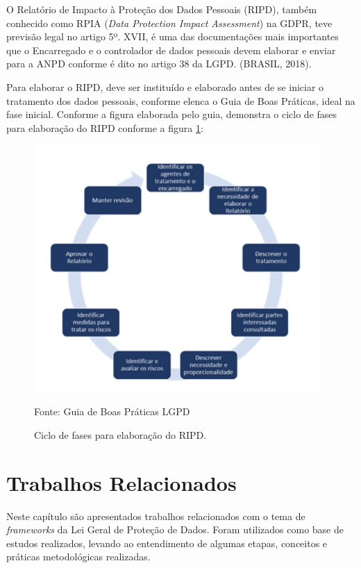 \documentclass[
	12pt,				%
	openright,			%
	oneside,			%
	a4paper,			%
	english,			%
	french,				%
	spanish,			%
	brazil,				%
	]{abntex2}
\begin{document}
O Relatório de Impacto à Proteção dos Dados Pessoais (RIPD), também conhecido como RPIA (\textit{Data Protection Impact Assessment}) na GDPR, teve previsão legal no artigo 5º. XVII, é uma das documentações mais importantes que o Encarregado e o controlador de dados pessoais devem elaborar e enviar para a ANPD conforme é dito no artigo 38 da LGPD. (BRASIL, 2018).

Para elaborar o RIPD, deve ser instituído e elaborado antes de se iniciar o tratamento dos dados pessoais, conforme elenca o Guia de Boas Práticas, ideal na fase inicial. Conforme a figura elaborada pelo guia, demonstra o ciclo de fases para elaboração do RIPD conforme a figura \ref{fig: CicloRIPD }:
\begin{figure}[ht]
    \centering
    \caption{Ciclo de fases para elaboração do RIPD.}
    \includegraphics[width=4.3in]{Images/07CicloRIPD.png}
    \label{fig: CicloRIPD }
    
    \centering \small Fonte: Guia de Boas Práticas LGPD
\end{figure}



\chapter{Trabalhos Relacionados}
\label{ch: trabalhos relacionados}

Neste capítulo são apresentados trabalhos relacionados com o tema de \textit{frameworks} da Lei Geral de Proteção de Dados. Foram utilizados como base de estudos realizados, levando ao entendimento de algumas etapas, conceitos e práticas metodológicas realizadas.
\end{document}
